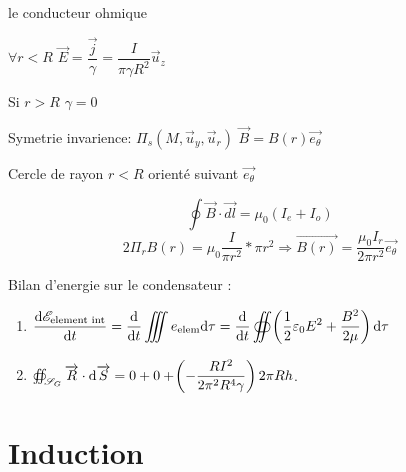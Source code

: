 \documentclass[a4paper,french,bookmarks]{book}
\begin{document}
\begin{example}{le conducteur ohmique}{}
\begin{enumerate}
\begin{minipage}{0.5\linewidth}
\begin{center}
                \end{center}
            \end{minipage}
            
            
            $\forall r<R$ $\vec{E} = \dfrac{\vec j}{\gamma} = \dfrac{I}{\pi \gamma R^2}\vec u_z$
            
            Si $r>R$ $\gamma = 0 $
            
            Symetrie invarience: $\Pi_s(M,\vec u_y,\vec u_r)$ \Rightarrow{} $\vec B =  B(r)\vec{e_\theta}$
            
            Cercle de rayon $r < R$ orienté suivant $\vec{e_\theta}$
            
            \[ \oint \vec{B} \cdot \vec{dl} = \mu_0 (I_e + I_o)\]
            \[ 2 \Pi_r B(r) = \mu_0 \dfrac{I}{\pi r^2} * \pi r^2 \Rightarrow{} \Vec{B(r)} = \dfrac{\mu_0 I_r}{2 \pi r^2} \vec{e_\theta}  \]
            
            Bilan d'energie sur le condensateur :
            
            \begin{enumerate}
                \item $\displaystyle\dfrac{\mathrm d \mathscr{E}_\text{element int}}{\mathrm d t} = \dfrac{\mathrm d}{\mathrm d t} \iiint e_\text{elem}\mathrm d \tau = \dfrac{\mathrm d}{\mathrm d t}\oiint \!\left(\dfrac{1}{2}\varepsilon_0 E^2 + \dfrac{B^2}{2\mu}\right)\mathrm d \tau$
                
                \item $\oiint_{\mathscr{S}_G} \overrightarrow{R} \cdot \mathrm d \overrightarrow{S} = 0 + 0 + \!\left(-\dfrac{RI^2}{2\pi^2R^4\gamma}\right)2\pi Rh$.
            \end{enumerate}
            
            
        \end{enumerate}
    \end{example}
    
    \chapter{Induction}
    
\end{document}
